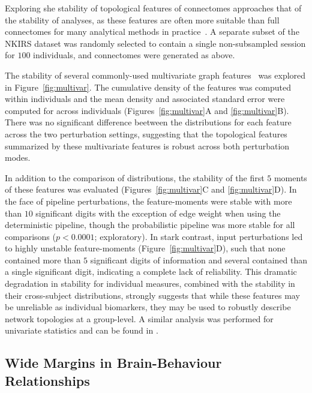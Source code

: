 \documentclass[fleqn,10pt]{SelfArx} %
\begin{document}
Exploring she stability of topological features of connectomes approaches that of the stability of analyses, as these
features are often more suitable than full connectomes for many analytical methods in practice~\cite{Rubinov2010-fh}.
A separate subset of the NKIRS dataset was randomly selected to contain a single non-subsampled session for $100$
individuals, and connectomes were generated as above.

The stability of several commonly-used multivariate graph features~\cite{Betzel2018-eo} was explored in
Figure~\ref{fig:multivar}. The cumulative density of the features was computed within individuals and the mean
density and associated standard error were computed for across individuals (Figures~\ref{fig:multivar}A and
\ref{fig:multivar}B). There was no significant difference beetween the distributions for each feature across the two
perturbation settings, suggesting that the topological features summarized by these multivariate features is robust
across both perturbation modes.

In addition to the comparison of distributions, the stability of the first $5$ moments of these features was evaluated
(Figures~\ref{fig:multivar}C and \ref{fig:multivar}D). In the face of pipeline perturbations, the feature-moments were
stable with more than $10$ significant digits with the exception of edge weight when using the deterministic pipeline,
though the probabilistic pipeline was more stable for all comparisons ($p < 0.0001$; exploratory). In stark contrast,
input perturbations led to highly unstable feature-moments (Figure~\ref{fig:multivar}D), such that none contained more
than $5$ significant digits of information and several contained than a single significant digit, indicating a complete
lack of reliability. This dramatic degradation in stability for individual measures, combined with the stability in
their cross-subject distributions, strongly suggests that while these features may be unreliable as individual
biomarkers, they may be used to robustly describe network topologies at a group-level. A similar analysis was performed
for univariate statistics and can be found in .

\subsection*{Wide Margins in Brain-Behaviour Relationships}
\end{document}
